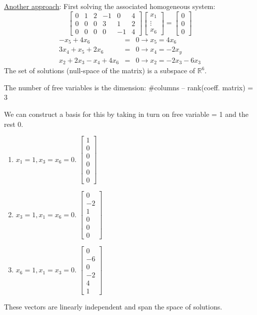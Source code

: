 \documentclass{article}
\begin{document}
{\underline{Another approach}}: First solving the associated homogeneous
system:
\[ \left[\begin{array}{cccccc}
     0 & 1 & 2 & - 1 & 0 & 4\\
     0 & 0 & 0 & 3 & 1 & 2\\
     0 & 0 & 0 & 0 & - 1 & 4
   \end{array}\right] \left[\begin{array}{c}
     x_1\\
     \vdots\\
     x_6
   \end{array}\right] = \left[\begin{array}{c}
     0\\
     0\\
     0
   \end{array}\right] \]
\[ \begin{array}{lll}
     - x_5 + 4 x_6 & = & 0 \rightarrow x_5 = 4 x_6\\
     3 x_4 + x_5 + 2 x_6 & = & 0 \rightarrow x_4 = - 2 x_y\\
     x_2 + 2 x_3 - x_4 + 4 x_6 & = & 0 \rightarrow x_2 = - 2 x_3 - 6 x_3
   \end{array} \]
The set of solutions (null-space of the matrix) is a subspace of
$\mathbb{R}^6$.

The number of free variables is the dimension: \#columns -- rank(coeff.
matrix) = 3

We can construct a basis for this by taking in turn on free variable = 1 and
the rest 0.
\begin{enumerate}
  \item $x_1 = 1, x_3 = x_6 = 0$. $\left[\begin{array}{c}
    1\\
    0\\
    0\\
    0\\
    0\\
    0
  \end{array}\right]$
  
  \item $x_3 = 1, x_1 = x_6 = 0$. $\left[\begin{array}{c}
    0\\
    - 2\\
    1\\
    0\\
    0\\
    0
  \end{array}\right]$
  
  \item $x_6 = 1, x_1 = x_3 = 0$. $\left[\begin{array}{c}
    0\\
    - 6\\
    0\\
    - 2\\
    4\\
    1
  \end{array}\right]$
\end{enumerate}
These vectors are linearly independent and span the space of solutions.
\end{document}

